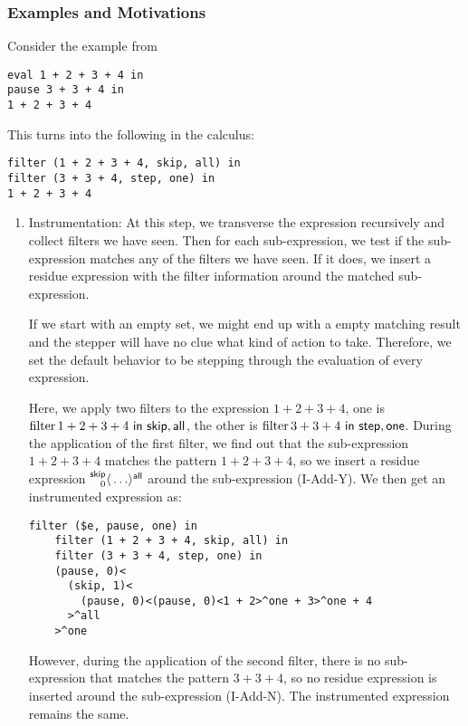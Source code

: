 \subsubsection{Examples and Motivations}

Consider the example from
\begin{lstlisting}[language=hazel]
eval 1 + 2 + 3 + 4 in
pause 3 + 3 + 4 in
1 + 2 + 3 + 4
\end{lstlisting}

This turns into the following in the calculus:
\begin{lstlisting}[language=hazel]
filter (1 + 2 + 3 + 4, skip, all) in
filter (3 + 3 + 4, step, one) in
1 + 2 + 3 + 4
\end{lstlisting}

\begin{enumerate}
  \item Instrumentation: At this step, we transverse the expression recursively and collect filters we have seen. Then for each sub-expression, we test if the sub-expression matches any of the filters we have seen. If it does, we insert a residue expression with the filter information around the matched sub-expression.

  If we start with an empty set, we might end up with a empty matching result and the stepper will have no clue what kind of action to take. Therefore, we set the default behavior to be stepping through the evaluation of every expression.

  Here, we apply two filters to the expression \(1 + 2 + 3 + 4\), one is \(\operatorname{filter} 1 + 2 + 3 + 4 ~\mathsf{in}~ \mathsf{skip}, \mathsf{all}\), the other is \(\operatorname{filter} 3 + 3 + 4 ~\mathsf{in}~ \mathsf{step}, \mathsf{one}\). During the application of the first filter, we find out that the sub-expression \(1 + 2 + 3 + 4\) matches the pattern \(1 + 2 + 3 + 4\), so we insert a residue expression \(\prescript{\mathsf{skip}}{0}{\langle} \ldots \rangle^{\mathsf{all}}\) around the sub-expression (I-Add-Y). We then get an instrumented expression as:
  \begin{lstlisting}[language=hazel]
    filter ($e, pause, one) in
    filter (1 + 2 + 3 + 4, skip, all) in
    filter (3 + 3 + 4, step, one) in
    (pause, 0)<
      (skip, 1)<
        (pause, 0)<(pause, 0)<1 + 2>^one + 3>^one + 4
      >^all
    >^one
  \end{lstlisting}

  However, during the application of the second filter, there is no sub-expression that matches the pattern \(3 + 3 + 4\), so no residue expression is inserted around the sub-expression (I-Add-N). The instrumented expression remains the same.


\end{enumerate}
